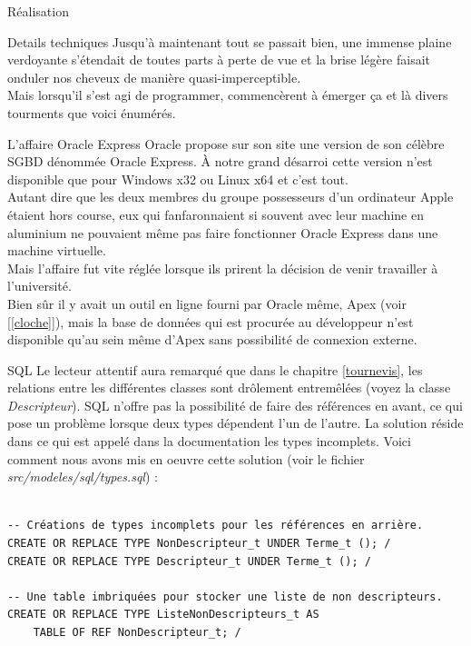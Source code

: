 \documentclass[a4paper, 12pt]{report}
\begin{document}
\begin{chapter}{Réalisation}
	\begin{section}{Details techniques}
		Jusqu'à maintenant tout se passait bien, une immense plaine verdoyante s'étendait de toutes parts à perte de vue et la brise légère faisait
		onduler nos cheveux de manière quasi-imperceptible.\\ Mais lorsqu'il s'est agi de programmer, commencèrent à émerger ça et là divers tourments
		que voici énumérés.

		\begin{subsection}{L'affaire Oracle Express}
			Oracle propose sur son site une version de son célèbre SGBD dénommée Oracle Express. À notre grand désarroi cette version n'est disponible
			que pour Windows x32 ou Linux x64 et c'est tout.\\
			Autant dire que les deux membres du groupe possesseurs d'un ordinateur Apple étaient hors course, eux qui fanfaronnaient si souvent avec leur
			machine en aluminium ne pouvaient même pas faire fonctionner Oracle Express dans une machine virtuelle.\\
			Mais l'affaire fut vite réglée lorsque ils prirent la décision de venir travailler à l'université.\\

			Bien sûr il y avait un outil en ligne fourni par Oracle même, Apex (voir [\ref{cloche}]), mais la base de données qui est procurée au développeur n'est
			disponible qu'au sein même d'Apex sans possibilité de connexion externe.
		\end{subsection}

		\begin{subsection}{SQL}
			Le lecteur attentif aura remarqué que dans le chapitre \ref{tournevis}, les relations entre les différentes classes sont drôlement
			entremêlées (voyez la classe \emph{Descripteur}). SQL n'offre pas la possibilité de faire des références en avant,
			ce qui pose un problème lorsque deux types dépendent l'un de l'autre. La solution réside dans ce qui est appelé dans la documentation les types
			incomplets. Voici comment nous avons mis en oeuvre cette solution (voir le fichier \emph{src/modeles/sql/types.sql}) : \\~\\
			\begin{verbatim}
-- Créations de types incomplets pour les références en arrière.
CREATE OR REPLACE TYPE NonDescripteur_t UNDER Terme_t (); /
CREATE OR REPLACE TYPE Descripteur_t UNDER Terme_t (); /

-- Une table imbriquées pour stocker une liste de non descripteurs.
CREATE OR REPLACE TYPE ListeNonDescripteurs_t AS 
    TABLE OF REF NonDescripteur_t; /


\end{verbatim}
\end{subsection}
\end{section}
\end{chapter}
\end{document}
